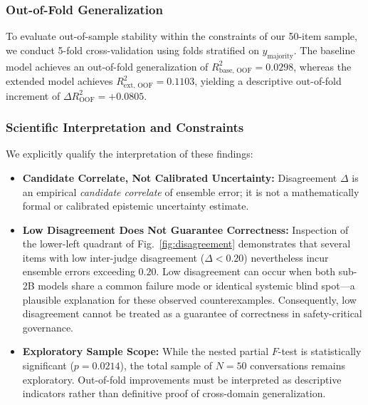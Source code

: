 \subsubsection{Out-of-Fold Generalization}
To evaluate out-of-sample stability within the constraints of our 50-item sample, we conduct 5-fold cross-validation using folds stratified on $y_{\text{majority}}$. The baseline model achieves an out-of-fold generalization of $R^2_{\text{base, OOF}} = 0.0298$, whereas the extended model achieves $R^2_{\text{ext, OOF}} = 0.1103$, yielding a descriptive out-of-fold increment of $\Delta R^2_{\text{OOF}} = +0.0805$.

\subsubsection{Scientific Interpretation and Constraints}
We explicitly qualify the interpretation of these findings:
\begin{itemize}
    \item \textbf{Candidate Correlate, Not Calibrated Uncertainty:} Disagreement $\Delta$ is an empirical \textit{candidate correlate} of ensemble error; it is not a mathematically formal or calibrated epistemic uncertainty estimate.
    \item \textbf{Low Disagreement Does Not Guarantee Correctness:} Inspection of the lower-left quadrant of Fig.~\ref{fig:disagreement} demonstrates that several items with low inter-judge disagreement ($\Delta < 0.20$) nevertheless incur ensemble errors exceeding $0.20$. Low disagreement can occur when both sub-2B models share a common failure mode or identical systemic blind spot—a plausible explanation for these observed counterexamples. Consequently, low disagreement cannot be treated as a guarantee of correctness in safety-critical governance.
    \item \textbf{Exploratory Sample Scope:} While the nested partial $F$-test is statistically significant ($p=0.0214$), the total sample of $N=50$ conversations remains exploratory. Out-of-fold improvements must be interpreted as descriptive indicators rather than definitive proof of cross-domain generalization.
\end{itemize}
